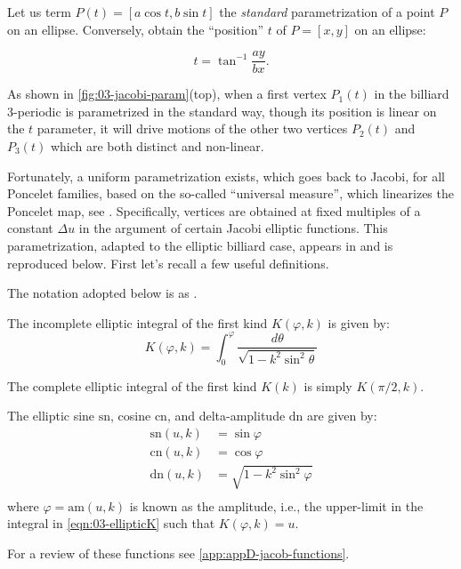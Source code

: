 Let us term $P(t)=[a\cos{t},b\sin{t}]$ the {\em standard} parametrization of a point $P$ on an ellipse. Conversely, obtain the ``position'' $t$ of $P=[x,y]$ on an ellipse:

\[ t=\tan^{-1}{\frac{a y}{b x}}. \]

As shown in \cref{fig:03-jacobi-param}(top), when a first vertex $P_1(t)$ in the billiard 3-periodic is parametrized in the standard way, though its position is linear on the $t$ parameter, it will drive motions of the other two vertices $P_2(t)$ and $P_3(t)$ which are both distinct and non-linear. 

Fortunately, a uniform parametrization exists, which goes back to Jacobi, for all Poncelet families, based on the so-called ``universal measure'', which linearizes the Poncelet map, see \cite{koiller2021-spatial}. Specifically, vertices are obtained at fixed multiples of a constant $\Delta{u}$ in the argument of certain Jacobi elliptic functions. This parametrization, adapted to the elliptic billiard case, appears in \cite{stachel2021-billiards,stachel2021-billiards-param} and is reproduced below. First let's recall a few useful definitions. 

The  notation adopted below is as \cite{armitage-2006}. 

\begin{definition}
The incomplete elliptic integral of the first kind $K(\varphi,k)$ is given by:
\begin{equation}
K(\varphi,k)=\int_0^{\varphi}\frac{d\theta}{\sqrt{1-k^2 \sin^2\theta}}
\label{eqn:03-ellipticK}
\end{equation}

The complete elliptic integral of the first kind $K(k)$ is simply $K(\pi/2,k)$.
\end{definition}

\begin{definition}
The elliptic sine $\text{sn}$, cosine $\text{cn}$, and delta-amplitude $\text{dn}$ are given by:
\begin{align*}
\text{sn}(u,k)&=\sin\varphi\\
\text{cn}(u,k)&=\cos\varphi\\
\text{dn}(u,k)&=\sqrt{1- k^2\sin^2\varphi}\\
\end{align*}
where $\varphi=\text{am}(u,k)$ is known as the amplitude, i.e., the upper-limit in the integral in \cref{eqn:03-ellipticK} such that $K(\varphi,k)=u$.
\end{definition}
For a review of these functions see \cref{app:appD-jacob-functions}.

